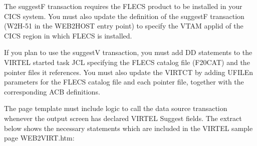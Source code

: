 \documentclass[letterpaper,10pt,english]{sphinxmanual}
\begin{document}
The suggestF transaction requires the FLECS product to be installed in your CICS system. You must also update the
definition of the suggestF transaction (W2H-51 in the WEB2HOST entry point) to specify the VTAM applid of the CICS
region in which FLECS is installed.

If you plan to use the suggestV transaction, you must add DD statements to the VIRTEL started task JCL specifying the
FLECS catalog file (F20CAT) and the pointer files it references. You must also update the VIRTCT by adding UFILEn
parameters for the FLECS catalog file and each pointer file, together with the corresponding ACB definitions.


The page template must include logic to call the data source transaction whenever the output screen has declared
VIRTEL Suggest fields. The extract below shows the necessary statements which are included in the VIRTEL sample
page WEB2VIRT.htm:
\end{document}
